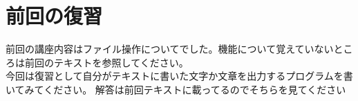 \section{前回の復習}
前回の講座内容はファイル操作についてでした。機能について覚えていないところは前回のテキストを参照してください。\\

今回は復習として自分がテキストに書いた文字か文章を出力するプログラムを書いてみてください。
解答は前回テキストに載ってるのでそちらを見てください